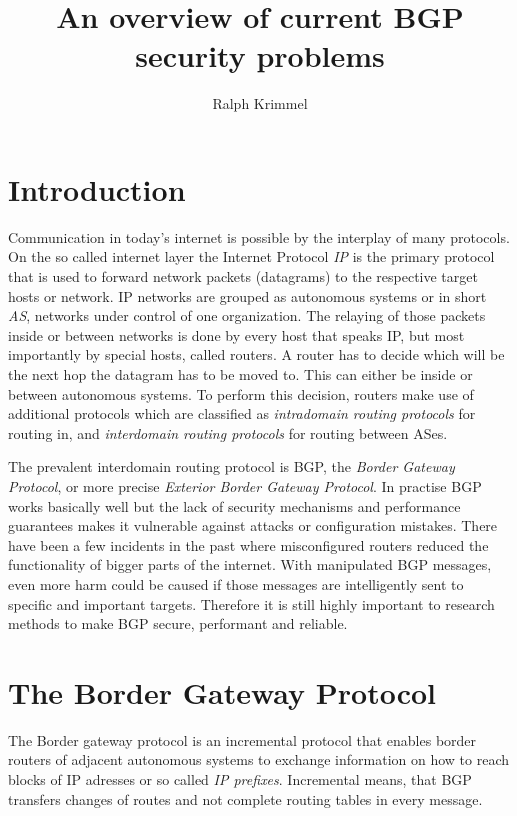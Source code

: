 \documentclass[12pt,a4paper]{IEEEtran}
\author{Ralph Krimmel}
\title{An overview of current BGP security problems}
\begin{document}
	\maketitle
	\begin{abstract}
	
	\end{abstract}
	\section{Introduction}
	Communication in today's internet is possible by the interplay of many protocols. 
	On the so called internet layer the Internet Protocol \emph{IP} is the primary protocol that is used to forward network packets (datagrams) to the respective target hosts or network. 
	IP networks are grouped as autonomous systems or in short \emph{AS}, networks under control of one organization. 
	The relaying of those packets inside or between networks is done by every host that speaks IP, but most importantly by special hosts, called routers. 
	A router has to decide which will be the next hop the datagram has to be moved to. 
	This can either be inside or between autonomous systems. 
	To perform this decision, routers make use of additional protocols which are classified as \emph{intradomain routing protocols} for routing in, and \emph{interdomain routing protocols} for routing between ASes. 

	The prevalent interdomain routing protocol is BGP, the \emph{Border Gateway Protocol}, or more precise \emph{Exterior Border Gateway Protocol}. 
	In practise BGP works basically well but the lack of security mechanisms and performance guarantees makes it vulnerable against attacks or configuration mistakes. 
	There have been a few incidents in the past where misconfigured routers reduced the functionality of bigger parts of the internet. 
	With manipulated BGP messages, even more harm could be caused if those messages are intelligently sent to specific and important targets. 
	Therefore it is still highly important to research methods to make BGP secure, performant and reliable. 

	\section{The Border Gateway Protocol}
	The Border gateway protocol is an incremental protocol that enables border routers of adjacent autonomous systems to exchange information on how to reach blocks of IP adresses or so called \emph{IP prefixes}. 
	Incremental means, that BGP transfers changes of routes and not complete routing tables in every message.
\end{document}
